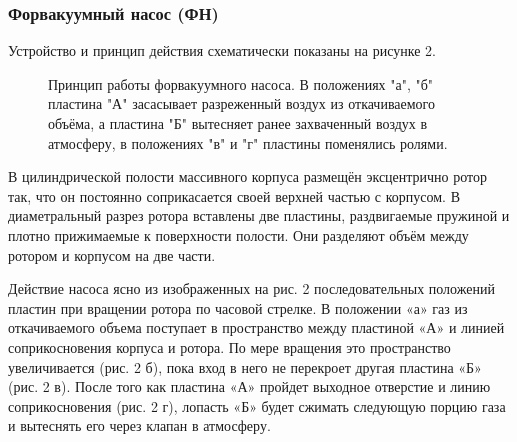 \subsubsection{Форвакуумный насос (ФН)}
Устройство и принцип действия схематически показаны на рисунке 2.
\begin{figure}[ht]
    \label{figure2}
    \caption{Принцип работы форвакуумного насоса. В положениях "а", "б" пластина "А" засасывает разреженный воздух из откачиваемого объёма, а пластина "Б" вытесняет ранее захваченный воздух в атмосферу, в положениях "в" и "г" пластины поменялись ролями.}
\end{figure}

В цилиндрической полости массивного корпуса размещён эксцентрично ротор так, что он постоянно соприкасается своей верхней частью с корпусом. В диаметральный разрез ротора вставлены две пластины, раздвигаемые пружиной и плотно прижимаемые к поверхности полости. Они разделяют объём между ротором и корпусом на две части.

Действие насоса ясно из изображенных на рис. 2 последовательных положений пластин при вращении ротора по часовой стрелке.
В положении «а» газ из откачиваемого объема поступает в пространство между пластиной «А» и линией соприкосновения корпуса и ротора. По мере вращения это пространство увеличивается (рис. 2 б), пока вход в него не перекроет другая пластина «Б» (рис. 2 в). После того как пластина «А» пройдет выходное отверстие и линию соприкосновения (рис. 2 г), лопасть «Б» будет сжимать следующую порцию газа и вытеснять его через клапан в атмосферу.

